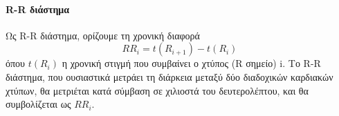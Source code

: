\paragraph{R-R διάστημα}
Ως R-R διάστημα, ορίζουμε τη χρονική διαφορά
\begin{equation}
\label{eq:RR}
   RR_i = t(R_{i+1}) - t(R_i)
\end{equation}
όπου $t(R_i)$ η χρονική στιγμή που συμβαίνει ο χτύπος (R σημείο) i. Το R-R διάστημα, που ουσιαστικά μετράει τη διάρκεια μεταξύ δύο διαδοχικών καρδιακών χτύπων, θα μετριέται κατά σύμβαση σε χιλιοστά του δευτερολέπτου, και θα συμβολίζεται ως $RR_i$.


